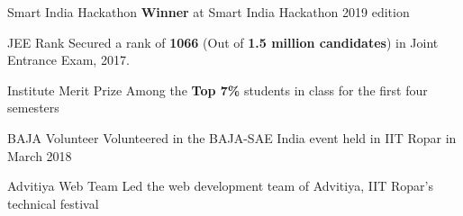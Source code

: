 
\begin{misc}


\cvskill
{Smart India Hackathon} %
{{ \textbf{Winner} at Smart India Hackathon 2019 edition}}

\cvskill
{JEE Rank} %
{{Secured a rank of }\textbf{1066} { (Out of \textbf{1.5 million candidates}) }{in Joint Entrance Exam, 2017.}}

\cvskill
{Institute Merit Prize} %
{{Among the \textbf{Top 7\%} students in class for the first four semesters}}

\cvskill
{BAJA Volunteer} %
{{Volunteered in the BAJA-SAE India event held in IIT Ropar in March 2018}}

\cvskill
{Advitiya Web Team} %
{{Led the web development team of Advitiya, IIT Ropar's technical festival}}


\end{misc}
